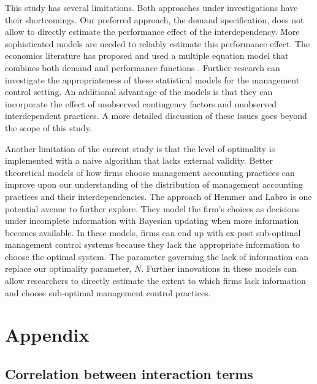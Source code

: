 \documentclass[12pt]{article}
\begin{document}
This study has several limitations. Both approaches under investigations
have their shortcomings. Our preferred approach, the demand
specification, does not allow to directly estimate the performance
effect of the interdependency. More sophisticated models are needed to
reliably estimate this performance effect. The economics literature has
proposed and used a multiple equation model that combines both demand
and performance functions
\citep{Athey1998, Gentzkow2007, Kretschmer2012, Miravete2006}. Further
research can investigate the appropriateness of these statistical models
for the management control setting. An additional advantage of the
models is that they can incorporate the effect of unobserved contingency
factors and unobserved interdependent practices. A more detailed
discussion of these issues goes beyond the scope of this study.

Another limitation of the current study is that the level of optimality
is implemented with a naive algorithm that lacks external validity.
Better theoretical models of how firms choose management accounting
practices can improve upon our understanding of the distribution of
management accounting practices and their interdependencies. The
approach of Hemmer and Labro \citeyearpar{Hemmer2015} is one potential
avenue to further explore. They model the firm's choices as decisions
under incomplete information with Bayesian updating when more
information becomes available. In these models, firms can end up with
ex-post sub-optimal management control systems because they lack the
appropriate information to choose the optimal system. The parameter
governing the lack of information can replace our optimality parameter,
\(N\). Further innovations in these models can allow researchers to
directly estimate the extent to which firms lack information and choose
sub-optimal management control practices.

\pagebreak

\appendix
\renewcommand{\theequation}{A.\arabic{equation}}
\setcounter{equation}{0}

\section{Appendix}\label{appendix}

\subsection{Correlation between interaction terms}\label{correlation-interaction}
\end{document}
